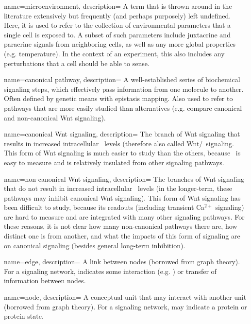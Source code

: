 {
	name=microenvironment,
	description={ A term that is thrown around in the literature extensively
				  but frequently (and perhaps purposely) left undefined. Here,
				  it is used to refer to the collection of environmental parameters that
				  a single cell is exposed to. A subset of such parameters include
				  juxtacrine and paracrine signals from neighboring cells, as well
				  as any more global properties (e.g. temperature). In the context of an
				  experiment, this also includes any perturbations that a cell should
				  be able to sense.}
}

{
  name=canonical pathway,
  description={ A well-established series of biochemical signaling steps,
				which effectively pass information from one molecule to another.
				Often defined by genetic means with epistasis mapping. Also used
				to refer to pathways that are more easily studied than alternatives
                (e.g. compare
				canonical and non-canonical Wnt signaling).}
}

{
	name=canonical Wnt signaling,
	description={ The branch of Wnt signaling that results in increased
				  intracellular \bcat\ levels (therefore also called
                  Wnt/\bcat\ signaling. This form of Wnt signaling
				  is much easier to study than the others, because \bcat\
				  is easy to measure and is relatively insulated from
				  other signaling pathways.}
}

{
	name=non-canonical Wnt signaling,
	description={ The branches of Wnt signaling that do not result in increased
				  intracellular \bcat\ levels (in the longer-term, these pathways
				  may inhibit canonical Wnt signaling). This form of Wnt signaling
				  has been difficult to study, because its readouts (including
				  transient Ca$^{2+}$ signaling) are hard to measure and are integrated
				  with many other signaling pathways. For these reasons, it is not
				  clear how many non-canonical pathways there are, how distinct one
				  is from another, and what the impacts of this form of signaling are
				  on canonical signaling (besides general long-term inhibition).}
}

{
	name=edge,
	description={ A link between nodes (borrowed from graph theory). For a signaling network,
				  indicates some interaction (e.g. \pn) or transfer of information between
				  nodes.}
}

{
	name=node,
	description={ A conceptual unit that may interact with another unit
                 (borrowed from graph theory).
				  For a signaling network, may indicate a protein or protein state.}
}

